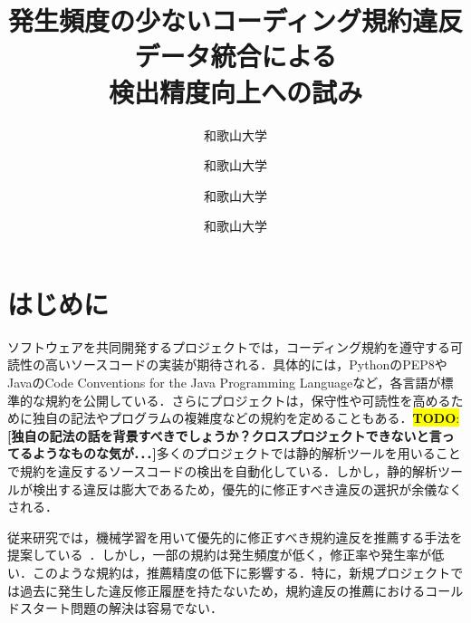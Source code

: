 \documentclass[uplatex,dvipdfmx,a4paper,twocolumn,base=11pt,jbase=11pt,ja=standard]{bxjsarticle}  %
\title{発生頻度の少ないコーディング規約違反データ統合による\\検出精度向上への試み}{Toward improving detection accuracy by integrating occasional coding convention violations datasets}
\author{和歌山大学}{亀岡　令}{Ryo Kameoka, Wakayama University}
\author{和歌山大学}{伊原　彰紀}{Akinori Ihara, Wakayama University}
\author{和歌山大学}{南　雄太}{Yuta Minami, Wakayama University}
\author{和歌山大学}{大森　楓木}{Fuki Omori, Wakayama University}
\newcommand{\todo}[1]{\colorbox{yellow}{{\bf TODO}:}{\color{red} {\textbf{[#1]}}}}
\begin{document}
\maketitle

\section{はじめに}
ソフトウェアを共同開発するプロジェクトでは，コーディング規約を遵守する可読性の高いソースコードの実装が期待される．具体的には，PythonのPEP8やJavaのCode Conventions for the Java Programming Languageなど，各言語が標準的な規約を公開している．さらにプロジェクトは，保守性や可読性を高めるために独自の記法やプログラムの複雑度などの規約を定めることもある．\todo{独自の記法の話を背景すべきでしょうか？クロスプロジェクトできないと言ってるようなものな気が．．．}多くのプロジェクトでは静的解析ツールを用いることで規約を違反するソースコードの検出を自動化している．しかし，静的解析ツールが検出する違反は膨大であるため，優先的に修正すべき違反の選択が余儀なくされる．


従来研究では，機械学習を用いて優先的に修正すべき規約違反を推薦する手法を提案している~\cite{article1}．しかし，一部の規約は発生頻度が低く，修正率や発生率が低い．このような規約は，推薦精度の低下に影響する．特に，新規プロジェクトでは過去に発生した違反修正履歴を持たないため，規約違反の推薦におけるコールドスタート問題の解決は容易でない．


\end{document}
